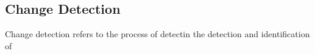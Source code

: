 \subsection{Change Detection}

Change detection refers to the process of detectin the detection and identification of 